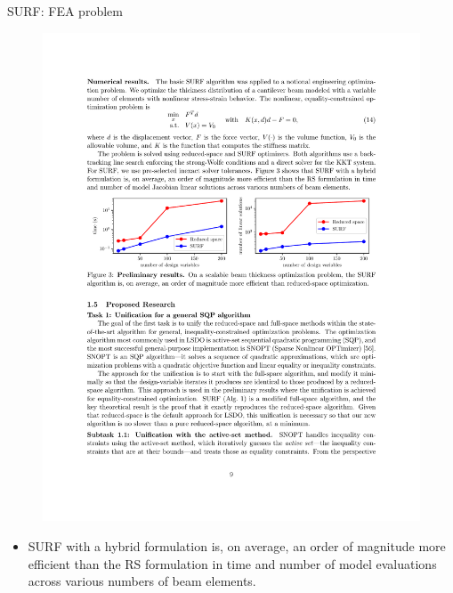 \documentclass{beamer}
\begin{document}
  \begin{frame}{SURF: FEA problem}

    \begin{figure}[ht]
        \centering
        \vspace{0mm}
        \includegraphics[width=\linewidth]{Figures/Figure3.pdf}
        \vspace{-5mm}
    \end{figure}
    \begin{itemize}
      \item SURF with a hybrid formulation is, on average, an order of magnitude more efficient than the RS formulation in time and number of model evaluations across various numbers of beam elements.
    \end{itemize}
  \end{frame}
\end{document}
